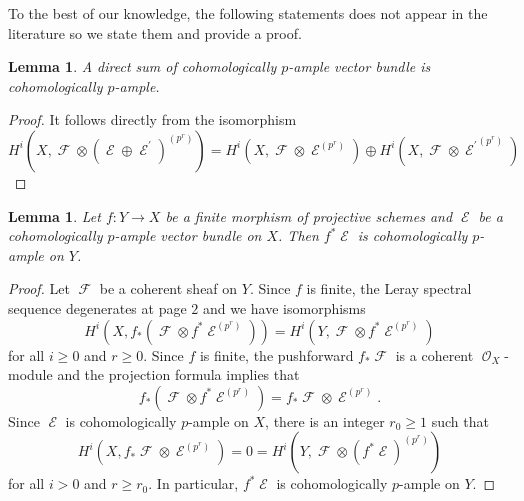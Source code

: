 \documentclass[11pt]{amsart}
\numberwithin{subsection}{section}
\numberwithin{figure}{section}
\numberwithin{table}{section}
\theoremstyle{1}
\newtheorem{lemma}[theorem]{Lemma}
\theoremstyle{2}
\DeclareMathOperator{\Fc}{\mathcal{F}}
\DeclareMathOperator{\E}{\mathcal{E}}
\DeclareMathOperator{\Oc}{\mathcal{O}}
\begin{document}
To the best of our knowledge, the following statements does not appear in the literature so we state them and provide a proof.  
\begin{lemma}\label{prop13}
A direct sum of cohomologically $p$-ample vector bundle is cohomologically $p$-ample.
\end{lemma}
\begin{proof}
It follows directly from the isomorphism
\begin{equation*}
H^i(X,\Fc\otimes (\E \oplus \E^\prime)^{(p^r)}) = H^i(X,\Fc\otimes \E^{(p^r)}) \oplus H^i(X,\Fc\otimes {\E^{\prime}}^{(p^r)})
\end{equation*}
\end{proof}
\begin{lemma}\label{prop14}
Let $f : Y \rightarrow X$ be a finite morphism of projective schemes and $\E$ be a cohomologically $p$-ample vector bundle on $X$. Then $f^*\E$ is cohomologically $p$-ample on $Y$.
\end{lemma}
\begin{proof}
Let $\Fc$ be a coherent sheaf on $Y$. Since $f$ is finite, the Leray spectral sequence degenerates at page $2$ and we have isomorphisms
\begin{equation*}
H^i(X,f_*(\Fc \otimes f^*\E^{(p^r)})) = H^i(Y,\Fc\otimes f^*\E^{(p^r)})
\end{equation*}
for all $i \geq 0$ and $r \geq 0$. Since $f$ is finite, the pushforward $f_*\Fc$ is a coherent $\Oc_X$-module and the projection formula implies that
\begin{equation*}
f_*(\Fc \otimes f^*\E^{(p^r)}) = f_*\Fc \otimes \E^{(p^r)}.
\end{equation*}
Since $\E$ is cohomologically $p$-ample on $X$, there is an integer $r_0 \geq 1$ such that
\begin{equation*}
H^i(X, f_*\Fc \otimes \E^{(p^r)}) = 0 = H^i(Y,\Fc\otimes (f^*\E)^{(p^r)})
\end{equation*} 
for all $i>0$ and $r\geq r_0$. In particular, $f^*\E$ is cohomologically $p$-ample on $Y$.
\end{proof}
\end{document}
